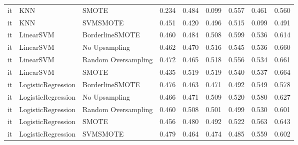 \begin{tabular}{lllllllll}
      it &                          KNN &               SMOTE & 0.234 &                     0.484 &                 0.099 &                  0.557 &                                   0.461 &     0.560 \\
      it &                          KNN &            SVMSMOTE & 0.451 &                     0.420 &                 0.496 &                  0.515 &                                   0.099 &     0.491 \\
      it &                    LinearSVM &     BorderlineSMOTE & 0.460 &                     0.484 &                 0.508 &                  0.599 &                                   0.536 &     0.614 \\
      it &                    LinearSVM &       No Upsampling & 0.462 &                     0.470 &                 0.516 &                  0.545 &                                   0.536 &     0.660 \\
      it &                    LinearSVM & Random Oversampling & 0.472 &                     0.465 &                 0.518 &                  0.556 &                                   0.534 &     0.661 \\
      it &                    LinearSVM &               SMOTE & 0.435 &                     0.519 &                 0.519 &                  0.540 &                                   0.537 &     0.664 \\
      it &           LogisticRegression &     BorderlineSMOTE & 0.476 &                     0.463 &                 0.471 &                  0.492 &                                   0.549 &     0.578 \\
      it &           LogisticRegression &       No Upsampling & 0.466 &                     0.471 &                 0.509 &                  0.520 &                                   0.580 &     0.627 \\
      it &           LogisticRegression & Random Oversampling & 0.460 &                     0.508 &                 0.501 &                  0.499 &                                   0.530 &     0.601 \\
      it &           LogisticRegression &               SMOTE & 0.456 &                     0.480 &                 0.492 &                  0.522 &                                   0.563 &     0.643 \\
      it &           LogisticRegression &            SVMSMOTE & 0.479 &                     0.464 &                 0.474 &                  0.485 &                                   0.559 &     0.602 \\

\end{tabular}
